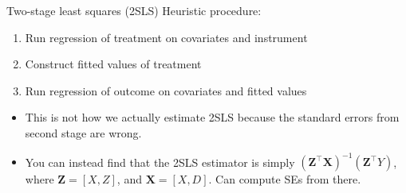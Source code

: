 \documentclass[xcolor=dvipsnames]{beamer}
\newcommand{\E}{\mathbb{E}}
\begin{document}
%
%

\begin{frame}{Two-stage least squares (2SLS)}
 Heuristic procedure:\\
\smallskip
  \begin{enumerate}
  \def\labelenumi{\arabic{enumi}.}
  \item<2->
    Run regression of treatment on covariates and instrument
  \item<3->
    Construct fitted values of treatment
  \item<4->
    Run regression of outcome on covariates and fitted values
  \end{enumerate}
  \begin{itemize}
\item<5->
  This is not how we actually estimate 2SLS because the
  standard errors from second stage are wrong. 
\item<6-> You can instead find that the 2SLS estimator is simply $(\mathbf{Z}^{\top}\mathbf{X})^{-1}(\mathbf{Z}^{\top}Y)$, where $\mathbf{Z}=[X,Z]$,  and $\mathbf{X} = [X, D]$. Can compute SEs from there. 
%
\end{itemize}
\end{frame}
\end{document}
